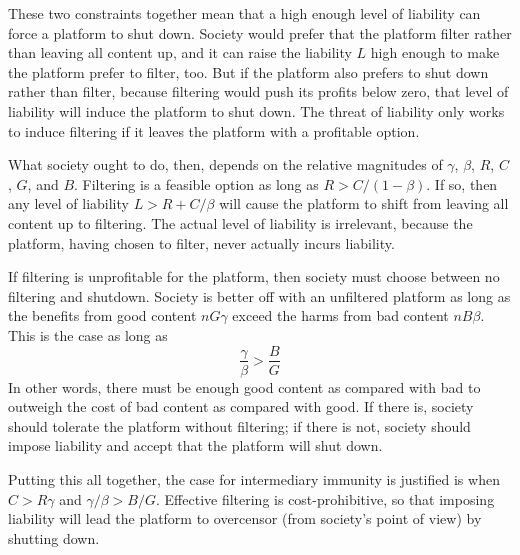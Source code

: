 \documentclass{article}
\begin{document}
These two constraints together mean that a high enough level of liability can force a platform to shut down.  Society would prefer that the platform filter rather than leaving all content up, and it can raise the liability $L$ high enough to make the platform prefer to filter, too. But if the platform also prefers to shut down rather than filter, because filtering would push its profits below zero, that level of liability will induce the platform to shut down. The threat of liability only works to induce filtering if it leaves the platform with a profitable option. 

What society ought to do, then, depends on the relative magnitudes of $\gamma$, $\beta$, $R$, $C$, $G$, and $B$. Filtering is a feasible option as long as $R > C/(1 - \beta)$. If so, then any level of liability $L > R + C/\beta$ will cause the platform to shift from leaving all content up to filtering. The actual level of liability is irrelevant, because the platform, having chosen to filter, never actually incurs liability. 

If filtering is unprofitable for the platform, then society must choose between no filtering and shutdown. Society is better off with an unfiltered platform as long as the benefits from good content $nG\gamma$ exceed the harms from bad content $nB\beta$. This is the case as long as
$$
\frac{\gamma}{\beta} > \frac{B}{G} 
$$
In other words, there must be enough good content as compared with bad to outweigh the cost of bad content as compared with good. If there is, society should tolerate the platform without filtering; if there is not, society should impose liability and accept that the platform will shut down.

Putting this all together, the case for intermediary immunity is justified is when $C > R\gamma$ and $\gamma/\beta > B/G$. Effective filtering is cost-prohibitive, so that imposing liability will lead the platform to overcensor (from society's point of view) by shutting down.
\end{document}
